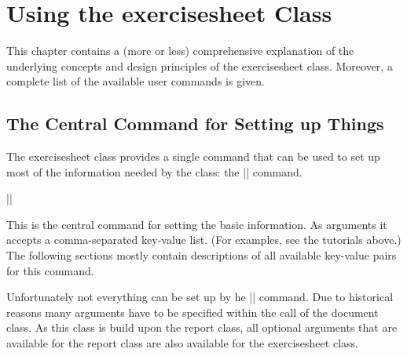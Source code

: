 \documentclass[a4paper,fleqn]{report}
\def\exercisesheet{{exercisesheet}}
\def\syntaxdefaultarg#1{\hfill\texttt{\small #1}\par\smallskip\noindent\ignorespaces}
\def\metaargument#1{\textit{\small #1}}
\begin{document}
\chapter{Using the \exercisesheet{} Class}

This chapter contains a (more or less) comprehensive explanation of
the underlying concepts and design principles of the \exercisesheet{}
class. Moreover, a complete list of the available user commands is
given.


% 

\section{The Central Command for Setting up Things}

The \exercisesheet{} class provides a single command that can be used
to set up most of the information needed by the class: the
|\sheetconf| command.

\begin{syntax}
  |\sheetconf{|\metaargument{key-value list}|}|
  \syntaxdefaultarg{}
  This is the central command for setting the basic information. As
  arguments it accepts a comma-separated key-value list. (For
  examples, see the tutorials above.) The following sections mostly
  contain descriptions of all available key-value pairs for this
  command.

\end{syntax}

\noindent Unfortunately not everything can be set up by he
|\sheetconf| command. Due to historical reasons many arguments have to
be specified within the call of the document class. As this class is
build upon the report class, all optional arguments that are available
for the report class are also available for the \exercisesheet{}
class.
\end{document}
